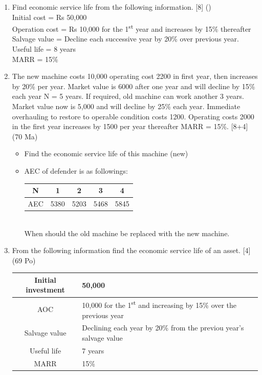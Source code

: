 \documentclass[12pt]{article}
\newcommand{\super}[1]{\textsuperscript{#1}}
\begin{document}
\begin{enumerate}
			\item Find economic service life from the following information. \hfill [8] () \\
			Initial cost = Rs 50,000 \\
			Operation cost = Rs 10,000 for the 1\super{st} year and increases by 15\% thereafter \\
			Salvage value = Decline each successive year by 20\% over previous year. \\
			Useful life = 8 years \\
			MARR = 15\%

			\item The new machine costs 10,000 operating cost 2200 in first year, then increases by 20\% per year. Market value is 6000 after one year and will decline by 15\% each year N = 5 years. If required, old machine can work another 3 years. Market value now is 5,000 and will decline by 25\% each year. Immediate overhauling to restore to operable condition costs 1200. Operating costs 2000 in the first year increases by 1500 per year thereafter MARR = 15\%. \hfill [8+4] (70 Ma)
			\begin{itemize}[noitemsep, topsep=0pt]
				\item Find the economic service life of this machine (new)
				\item AEC of defender is as followings:\\
				\begin{tabular}{|c|c|c|c|c|}
					\hline
					N & 1 & 2 & 3 & 4 \\ \hline
					AEC & 5380 & 5203 & 5468 & 5845 \\ \hline
				\end{tabular}\\
				When should the old machine be replaced with the new machine.
			\end{itemize}

			\item From the following information find the economic service life of an asset. \hfill [4] (69 Po) \\
			\begin{tabular}{|c|l|}
				\hline
				Initial investment & 50,000 \\ \hline
				AOC & 10,000 for the 1\super{st} and increasing by 15\% over the previous year \\ \hline
				Salvage value & Declining each year by 20\% from the previou year's salvage value \\ \hline
				Useful life & 7 years \\ \hline
				MARR & 15\% \\ \hline
			\end{tabular}


\end{enumerate}
\end{document}
